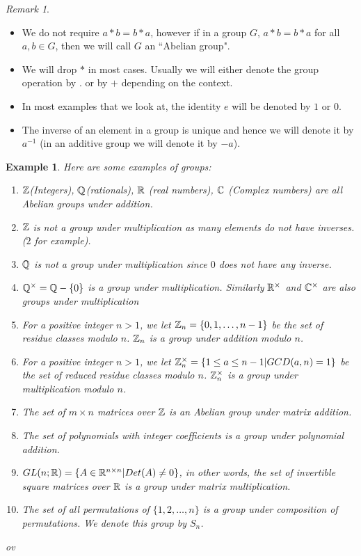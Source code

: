 \documentclass[12pt]{article}
\theoremstyle{plain}
\newtheorem{example}{Example}
\theoremstyle{definition}
\theoremstyle{remark}
\newtheorem{remark}{Remark}
\begin{document}
\begin{remark}
\begin{itemize}
    \item We do not require $a*b=b*a$, however if in a group $G$, $a*b=b*a$ for all $a,b\in G$, then we will call $G$ an ``Abelian group". 
    \item We will drop $*$ in most cases. Usually we will either denote the group operation by $.$ or by $+$ depending on the context. 
    \item In most examples that we look at, the identity $e$ will be denoted by $1$ or $0$. 
    \item The inverse of an element in a group is unique and hence we will denote it by $a^{-1}$ (in an additive group we will denote it by $-a$).
\end{itemize}
\end{remark}
\begin{example}
Here are some examples of groups:
\begin{enumerate}
    \item $\mathbb{Z}$(Integers), $\mathbb{Q}$(rationals), $\mathbb{R}$ (real numbers), $\mathbb{C}$ (Complex numbers) are all Abelian groups under addition.
    \item $\mathbb{Z}$ is not a group under multiplication as many elements do not have inverses. ($2$ for example).
    \item $\mathbb{Q}$ is not a group under multiplication since $0$ does not have any inverse.
    \item $\mathbb{Q}^{\times} = \mathbb{Q}-\{0\}$ is a group under multiplication. Similarly $\mathbb{R}^{\times}$ and $\mathbb{C}^{\times}$ are also groups under multiplication
    \item For a positive integer $n>1$, we let $\mathbb{Z}_n = \{0,1, \dots, n-1\}$ be the set of residue classes modulo $n$. $\mathbb{Z}_n$ is a group under addition modulo $n$. 
    \item For a positive integer $n>1$, we let $\mathbb{Z}_n^{\times} = \{1\leq a \leq n-1|GCD(a,n)=1\}$ be the set of reduced residue classes modulo $n$. $\mathbb{Z}_n^{\times}$ is a group under multiplication modulo $n$. 
    \item The set of $m\times n$ matrices over $\mathbb{Z}$ is an Abelian group under matrix addition. 
    \item The set of polynomials with integer coefficients is a group under polynomial addition. 
    \item $GL(n;\mathbb{R}) = \{A\in \mathbb{R}^{n\times n}|Det(A) \neq 0\}$, in other words, the set of invertible square matrices over $\mathbb{R}$ is a group under matrix multiplication. 
    \item The set of all permutations of $\{1,2, \dots, n\}$ is a group under composition of permutations. We denote this group by $S_n$.  
\end{enumerate}ov
\end{example}
\end{document}
